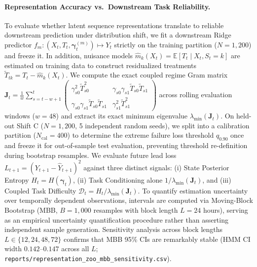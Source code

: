\documentclass[twoside]{article}
\theoremstyle{definition}
\newcommand{\E}{\mathbb{E}}
\begin{document}
\paragraph{Representation Accuracy vs.\ Downstream Task Reliability.}
To evaluate whether latent sequence representations translate to reliable downstream prediction under distribution shift, we fit a downstream Ridge predictor $f_m: (X_t, T_t, \boldsymbol{\gamma}_t^{(m)}) \mapsto Y_t$ strictly on the training partition ($N=1,200$) and freeze it. In addition, nuisance models $\hat{m}_k(X_t) = \E[T_t \mid X_t, S_t=k]$ are estimated on training data to construct residualized treatments $\tilde{T}_{tk} = T_t - \hat{m}_k(X_t)$. We compute the exact coupled regime Gram matrix $\boldsymbol{J}_t = \frac{1}{w}\sum_{s=t-w+1}^t \begin{pmatrix} \gamma_{s0}^2 \tilde{T}_{s0}^2 & \gamma_{s0}\gamma_{s1}\tilde{T}_{s0}\tilde{T}_{s1} \\ \gamma_{s0}\gamma_{s1}\tilde{T}_{s0}\tilde{T}_{s1} & \gamma_{s1}^2 \tilde{T}_{s1}^2 \end{pmatrix}$ across rolling evaluation windows ($w=48$) and extract its exact minimum eigenvalue $\lambda_{\min}(\boldsymbol{J}_t)$. On held-out Shift C ($N=1,200$, 5 independent random seeds), we split into a calibration partition ($N_{\mathrm{cal}}=400$) to determine the extreme failure loss threshold $q_{0.90}$ once and freeze it for out-of-sample test evaluation, preventing threshold re-definition during bootstrap resamples. We evaluate future lead loss $L_{t+1} = (Y_{t+1} - \hat{Y}_{t+1})^2$ against three distinct signals: (i) State Posterior Entropy $H_t = H(\boldsymbol{\gamma}_t)$, (ii) Task Conditioning alone $1/\lambda_{\min}(\boldsymbol{J}_t)$, and (iii) Coupled Task Difficulty $\mathcal{D}_t = H_t / \lambda_{\min}(\boldsymbol{J}_t)$. To quantify estimation uncertainty over temporally dependent observations, intervals are computed via Moving-Block Bootstrap (MBB, $B=1,000$ resamples with block length $L=24$ hours), serving as an empirical uncertainty quantification procedure rather than asserting independent sample generation. Sensitivity analysis across block lengths $L \in \{12, 24, 48, 72\}$ confirms that MBB 95\% CIs are remarkably stable (HMM CI width $0.142\text{--}0.147$ across all $L$; \texttt{reports/representation\_zoo\_mbb\_sensitivity.csv}).
\end{document}
